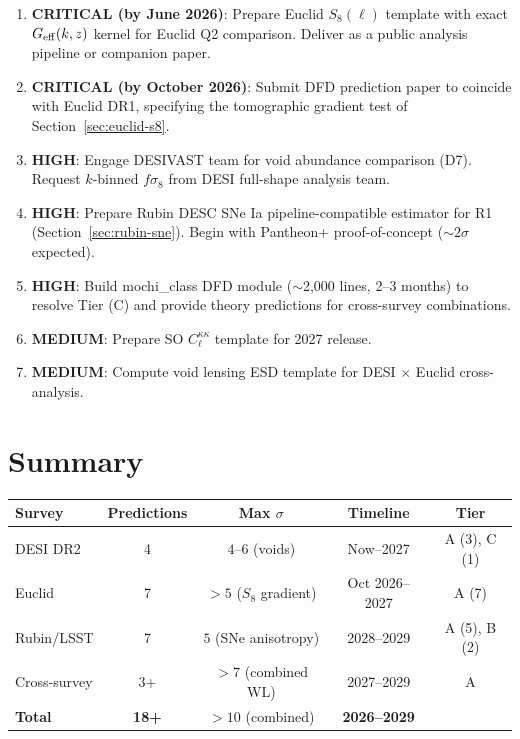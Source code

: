\documentclass[11pt,a4paper]{article}
\newcommand{\Geff}{G_{\rm eff}}
\begin{document}
\begin{enumerate}

\item \textbf{CRITICAL (by June 2026)}: Prepare Euclid $S_8(\ell)$
  template with exact $\Geff(k,z)$ kernel for Euclid Q2 comparison.
  Deliver as a public analysis pipeline or companion paper.

\item \textbf{CRITICAL (by October 2026)}: Submit DFD prediction
  paper to coincide with Euclid DR1, specifying the tomographic
  gradient test of Section~\ref{sec:euclid-s8}.

\item \textbf{HIGH}: Engage DESIVAST team for void abundance
  comparison (D7). Request $k$-binned $f\sigma_8$ from DESI
  full-shape analysis team.

\item \textbf{HIGH}: Prepare Rubin DESC SNe Ia pipeline-compatible
  estimator for R1 (Section~\ref{sec:rubin-sne}). Begin with
  Pantheon+ proof-of-concept ($\sim 2\sigma$ expected).

\item \textbf{HIGH}: Build mochi\_class DFD module ($\sim$2,000 lines,
  2--3 months) to resolve Tier (C) and provide theory predictions
  for cross-survey combinations.

\item \textbf{MEDIUM}: Prepare SO $C_\ell^{\kappa\kappa}$ template
  for 2027 release.

\item \textbf{MEDIUM}: Compute void lensing ESD template for
  DESI $\times$ Euclid cross-analysis.

\end{enumerate}


\section{Summary}

\begin{center}
\begin{tabular}{lcccc}
\toprule
\textbf{Survey} & \textbf{Predictions} & \textbf{Max $\sigma$}
& \textbf{Timeline} & \textbf{Tier} \\
\midrule
DESI DR2 & 4 & $4$--$6$ (voids) & Now--2027 & A (3), C (1) \\
Euclid & 7 & $> 5$ ($S_8$ gradient) & Oct 2026--2027 & A (7) \\
Rubin/LSST & 7 & $5$ (SNe anisotropy) & 2028--2029 & A (5), B (2) \\
Cross-survey & 3+ & $> 7$ (combined WL) & 2027--2029 & A \\
\midrule
\textbf{Total} & \textbf{18+} & $> 10$ (combined) & \textbf{2026--2029}
  & \\
\bottomrule
\end{tabular}
\end{center}
\end{document}
